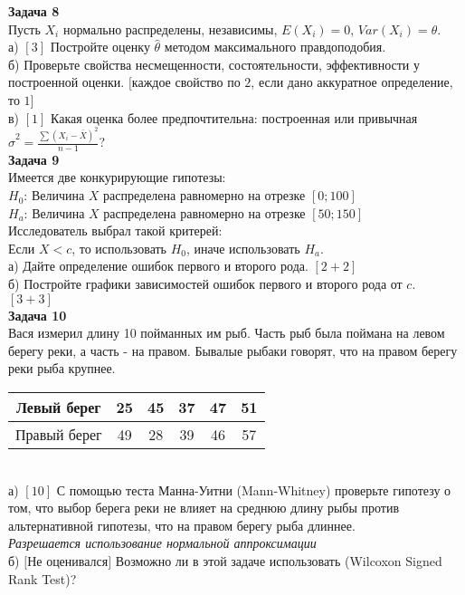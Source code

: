 \documentclass[pdftex,12pt,a4paper]{article}
\begin{document}
\textbf{Задача 8} \\ %
Пусть $X_{i}$ нормально распределены, независимы, $E(X_{i})=0$,
$Var(X_{i})=\theta$. \\
а) $[3]$ Постройте оценку $\hat{\theta}$ методом максимального
правдоподобия. \\
б) Проверьте свойства несмещенности, состоятельности,
эффективности у построенной оценки. $[$каждое свойство по $2$, если дано аккуратное определение, то $1]$  \\
в) $[1]$ Какая оценка более предпочтительна: построенная или
привычная
$\hat{\sigma}^{2}=\frac{\sum(X_{i}-\bar{X})^{2}}{n-1}$? \\


\textbf{Задача 9} \\ %
Имеется две конкурирующие гипотезы: \\
$H_{0}$: Величина $X$ распределена равномерно на отрезке $[0;100]$ \\
$H_{a}$: Величина $X$ распределена равномерно на отрезке $[50;150]$ \\
Исследователь выбрал такой критерей: \\
Если $X<c$, то использовать $H_{0}$, иначе использовать $H_{a}$. \\
а) Дайте определение ошибок первого и второго рода. $[2+2]$ \\
б) Постройте графики зависимостей ошибок первого и второго рода от
$c$. $[3+3]$\\

\newpage
\textbf{Задача 10} \\ %
Вася измерил длину 10 пойманных им рыб. Часть рыб была поймана на
левом берегу реки, а часть - на правом. Бывалые рыбаки говорят,
что на правом берегу реки рыба крупнее. \\
\begin{tabular}{|c|c|c|c|c|c|}
  \hline
  Левый берег & 25 & 45 & 37 & 47 & 51   \\
  \hline
  Правый берег & 49 & 28 & 39 & 46 & 57   \\
  \hline
\end{tabular} \\
а) $[10]$ С помощью теста Манна-Уитни (Mann-Whitney) проверьте
гипотезу о том, что выбор берега реки не влияет на среднюю длину
рыбы против
альтернативной гипотезы, что на правом берегу рыба длиннее. \\
\emph{Разрешается использование нормальной аппроксимации} \\
б) $[$Не оценивался$]$ Возможно ли в этой задаче использовать
(Wilcoxon Signed Rank
Test)? \\ \\ \\
\end{document}
